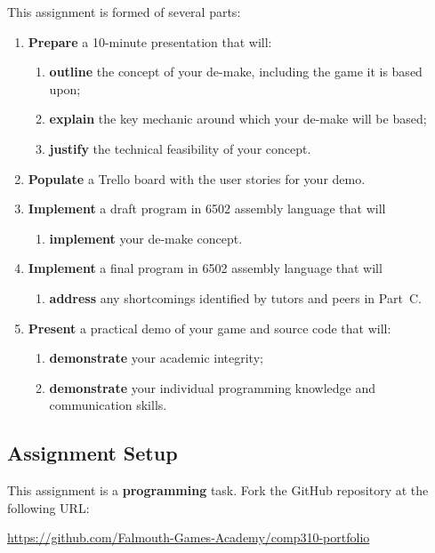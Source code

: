 \documentclass{../../fal_assignment}
\begin{document}
This assignment is formed of several parts:
\begin{enumerate}[label=(\Alph*)]
	\item \textbf{Prepare} a 10-minute presentation that will:
		\begin{enumerate}[label=(\roman*)]
			\item \textbf{outline} the concept of your de-make, including the game it is based upon;
			\item \textbf{explain} the key mechanic around which your de-make will be based;
			\item \textbf{justify} the technical feasibility of your concept.
		\end{enumerate}
	\item \textbf{Populate} a Trello board with the user stories for your demo.
	\item \textbf{Implement} a draft program in 6502 assembly language that will
		\begin{enumerate}[label=(\roman*)]
			\item \textbf{implement} your de-make concept.
		\end{enumerate}
	\item \textbf{Implement} a final program in 6502 assembly language that will
		\begin{enumerate}[label=(\roman*)]
			\item \textbf{address} any shortcomings identified by tutors and peers in Part~C.
		\end{enumerate}
	\item \textbf{Present} a practical demo of your game and source code that will:
		\begin{enumerate}[label=(\roman*)]
			\item \textbf{demonstrate} your academic integrity;
			\item \textbf{demonstrate} your individual programming knowledge and communication skills.
		\end{enumerate}
\end{enumerate}

\subsection*{Assignment Setup}

This assignment is a \textbf{programming} task. Fork the GitHub repository at the following URL:

\indent \url{https://github.com/Falmouth-Games-Academy/comp310-portfolio}
\end{document}
